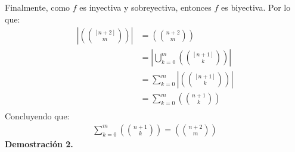 \begin{solucion}
Finalmente, como $f$ es inyectiva y sobreyectiva, entonces $f$ es biyectiva. Por lo que:
\begin{align*}
    \left|\left(\binom{[n+2]}{m}\right)\right| &= 
    \left(
        \binom{n+2}{m}
    \right)\\
    &= \left|
        \bigcup_{k=0}^m \left(\binom{[n+1]}{k}\right)
    \right|\\
    &= \sum_{k=0}^m \left|\left(\binom{[n+1]}{k}\right)\right|\\
    &= \sum_{k=0}^m \left(\binom{n+1}{k}\right)\\
\end{align*}
Concluyendo que:
\begin{align*}
    \sum_{k=0}^m\left(\binom{n+1}{k}\right)=\left(\binom{n+2}{m}\right)
\end{align*}
\textbf{Demostración 2.}


\end{solucion}
